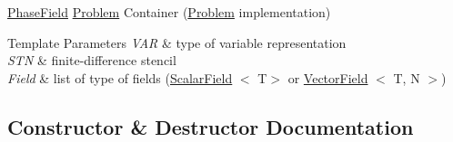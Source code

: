 \hyperlink{namespaceUintah_1_1PhaseField}{Phase\+Field} \hyperlink{classUintah_1_1PhaseField_1_1Problem}{Problem} Container (\hyperlink{classUintah_1_1PhaseField_1_1Problem}{Problem} implementation) 


\begin{DoxyTemplParams}{Template Parameters}
{\em V\+AR} & type of variable representation \\
\hline
{\em S\+TN} & finite-\/difference stencil \\
\hline
{\em Field} & list of type of fields (\hyperlink{structUintah_1_1PhaseField_1_1ScalarField}{Scalar\+Field} $<$ T$>$ or \hyperlink{structUintah_1_1PhaseField_1_1VectorField}{Vector\+Field} $<$ T, N $>$) \\
\hline
\end{DoxyTemplParams}


\subsection{Constructor \& Destructor Documentation}
\mbox{\label{structUintah_1_1PhaseField_1_1SubProblems_3_01Problem_3_01VAR_00_01STN_00_01Field_8_8_8_01_4_01_4_a4af57b0128042280f2511f3ffcca401b}} 
